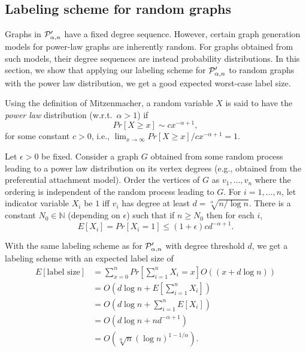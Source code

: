 \subsection{Labeling scheme for random graphs}
Graphs in $ \mathcal{P}'_{\alpha,n}$ have a fixed degree sequence. However, certain graph generation models for power-law graphs are inherently random. For graphs obtained from such models, their degree sequences are instead probability distributions. In this section, we show that applying our labeling scheme for $ \mathcal{P}'_{\alpha,n}$ to random graphs with the power law distribution, we get a good expected worst-case label size.

Using the definition of Mitzenmacher, a random variable $X$ is said to have the \emph{power law} distribution (w.r.t.~$\alpha > 1$) if
\[
  Pr[X\geq x] \sim cx^{-\alpha+1},
\]
for some constant $c > 0$, i.e., $\lim_{x\to\infty}Pr[X\geq x]/cx^{-\alpha+1} = 1$.

Let $\epsilon > 0$ be fixed. Consider a graph $G$ obtained from some random process leading to a power law distribution on its vertex degrees (e.g., obtained from the preferential attachment model). Order the vertices of $G$ as $v_1,\ldots,v_n$ where the ordering is independent of the random process leading to $G$. For $i=1,\ldots,n$, let indicator variable $X_i$ be $1$ iff $v_i$ has degree at least $d = \sqrt[\alpha]{n/\log n}$. There is a constant $N_0\in\mathbb N$ (depending on $\epsilon$) such that if $n\geq N_0$ then for each $i$,
\[
  E[X_i] = Pr[X_i = 1]\leq (1+\epsilon)cd^{-\alpha+1}.
\]

With the same labeling scheme as for $ \mathcal{P}'_{\alpha,n}$ with degree threshold $d$, we get a labeling scheme with an expected label size of
\begin{align*}
  E[\mbox{label size}] & = \sum_{x=0}^n Pr\left[\sum_{i=1}^n X_i = x\right]O((x+d\log n))\\
                       & = O\left(d\log n + E\left[\sum_{i=1}^n X_i\right]\right)\\
                       & = O\left(d\log n + \sum_{i=1}^n E[X_i]\right)\\
                       & = O\left(d\log n + nd^{-\alpha+1}\right)\\
                       & = O\left(\sqrt[\alpha]n(\log n)^{1-1/\alpha}\right).
\end{align*}

